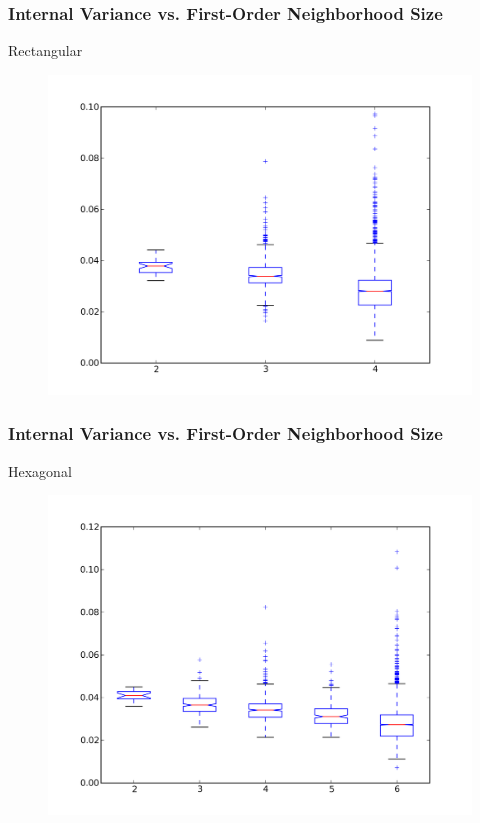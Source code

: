 \documentclass[nototal,handout]{beamer}
\begin{document}
\begin{frame}
	\frametitle{Internal Variance vs. First-Order Neighborhood Size}
 
\begin{block}{Rectangular}
  \begin{center}
  \begin{figure}
  \includegraphics[width=0.75\linewidth]{rook_iv_box.png}
  \end{figure}
  \end{center}
 \end{block} \end{frame} 

\begin{frame}
	\frametitle{Internal Variance vs. First-Order Neighborhood Size}
 
\begin{block}{Hexagonal}
  \begin{center}
  \begin{figure}
  \includegraphics[width=0.75\linewidth]{hex_iv_box.png}
  \end{figure}
  \end{center}
 \end{block} \end{frame} 
\end{document}
